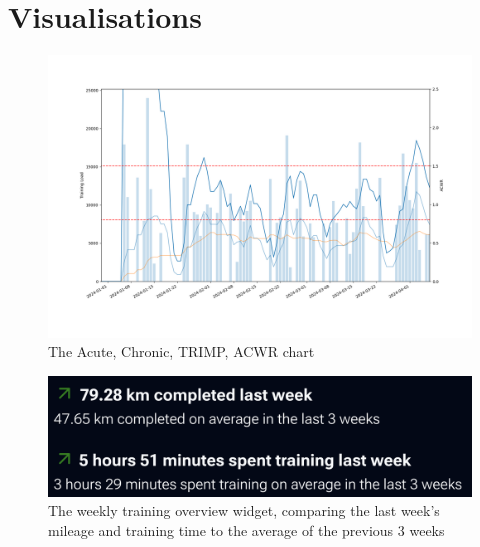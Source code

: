 \section{Visualisations}
\begin{figure}[!hp]
  \centering
  \includegraphics[width=\linewidth]{figures/acwr.png}
  \captionsetup{justification=centering}
  \caption*{\label{fig:app_acwr}The Acute, Chronic, TRIMP, ACWR chart}
\end{figure}
\begin{figure}[!hp]
  \centering
  \includegraphics[width=\linewidth]{figures/trainingOverviewWidget.png}
  \captionsetup{justification=centering}
  \caption*{\label{fig:app_weeklyTrainingOverview}The weekly training overview widget, comparing the last week's mileage and training time to the average of the previous 3 weeks} 
\end{figure}
